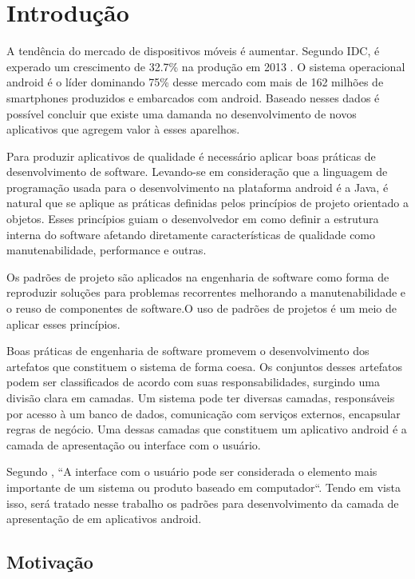 \chapter{Introdução}

A tendência do mercado de dispositivos móveis é aumentar. Segundo IDC,  é
experado um crescimento de 32.7\% na produção em 2013 \cite{idc:a}. O sistema
operacional android é o líder dominando 75\% desse mercado com mais de 162 milhões de
smartphones produzidos e embarcados com android\cite{idc:b}. Baseado nesses
dados é possível concluir que existe uma damanda no desenvolvimento de novos 
aplicativos que agregem valor à esses aparelhos.

Para produzir aplicativos de qualidade é necessário aplicar boas práticas de
desenvolvimento de software. Levando-se em consideração que a linguagem de
programação usada para o desenvolvimento na plataforma android é a Java, é
natural que se aplique as práticas definidas pelos princípios de projeto
orientado a objetos. Esses princípios guiam o desenvolvedor em como definir a
estrutura interna do software afetando diretamente características  de
qualidade como manutenabilidade, performance e outras\cite{tempero-di}.

Os padrões de projeto são aplicados na engenharia de software como forma de
reproduzir  soluções  para problemas recorrentes melhorando a manutenabilidade e
o reuso de componentes de software\cite{gof}.O uso de padrões de projetos
é um meio de aplicar esses princípios. 

Boas práticas de engenharia de software promevem o desenvolvimento dos
artefatos que constituem o sistema de forma coesa. Os conjuntos desses artefatos
podem ser classificados de acordo com suas responsabilidades, surgindo
uma divisão clara em camadas. Um sistema pode ter diversas camadas, responsáveis
por acesso à um banco de dados, comunicação com serviços externos, encapsular
regras de negócio. Uma dessas camadas que constituem um aplicativo android é a
camada de apresentação ou interface com o usuário.
 
Segundo , ``A interface com o usuário pode ser considerada
o elemento mais importante de um sistema ou produto baseado em computador``.
Tendo em vista isso, será tratado nesse trabalho  os padrões para
desenvolvimento da camada de apresentação de em aplicativos android.

\section{Motivação}


